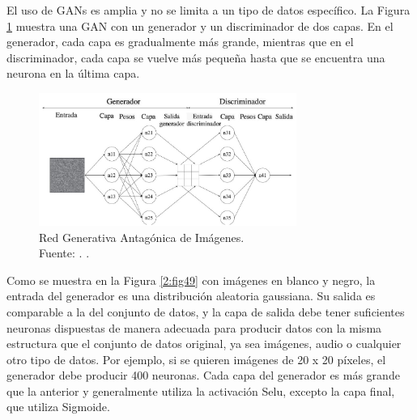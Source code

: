 El uso de GANs es amplia y no se limita a un tipo de datos específico. La Figura \ref{2:fig48} muestra una GAN con un generador y un discriminador de dos capas. En el generador, cada capa es gradualmente más grande, mientras que en el discriminador, cada capa se vuelve más pequeña hasta que se encuentra una neurona en la última capa. \parencite{tec_goodfellow2014gan}

\begin{figure}[!ht]
	\begin{center}
		\includegraphics[width=0.75\textwidth]{2/figures/redgan2.jpg}
		\caption[Red Generativa Antagónica de Imágenes]{Red Generativa Antagónica de Imágenes.\\
		Fuente: \cite{tec_goodfellow2014gan}. .}
		\label{2:fig48}
	\end{center}
\end{figure}

Como se muestra en la Figura \ref{2:fig49} con imágenes en blanco y negro, la entrada del generador es una distribución aleatoria gaussiana. Su salida es comparable a la del conjunto de datos, y la capa de salida debe tener suficientes neuronas dispuestas de manera adecuada para producir datos con la misma estructura que el conjunto de datos original, ya sea imágenes, audio o cualquier otro tipo de datos. Por ejemplo, si se quieren imágenes de 20 x 20 píxeles, el generador debe producir 400 neuronas. Cada capa del generador es más grande que la anterior y generalmente utiliza la activación Selu, excepto la capa final, que utiliza Sigmoide. \parencite{tec_goodfellow2014gan}

